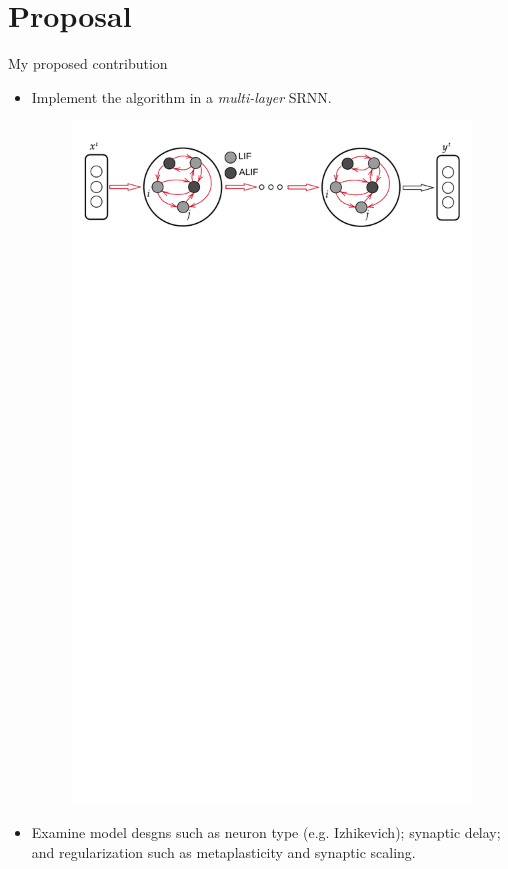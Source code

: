 \documentclass[t]{beamer}
\begin{document}
\section{Proposal}
\begin{frame}{My proposed contribution}
\begin{itemize}[label=--]
\item Implement the algorithm in a \emph{multi-layer} SRNN.
	\begin{figure}[!ht]
		\includegraphics[clip, trim=0cm 25cm 0cm 0cm, width=0.667\linewidth]{BellecDiagramML.pdf}  %
	\end{figure}
\item Examine model desgns such as neuron type (e.g. Izhikevich); synaptic delay; and regularization such as metaplasticity and synaptic scaling.
\end{itemize}
	
\end{frame}
\end{document}
